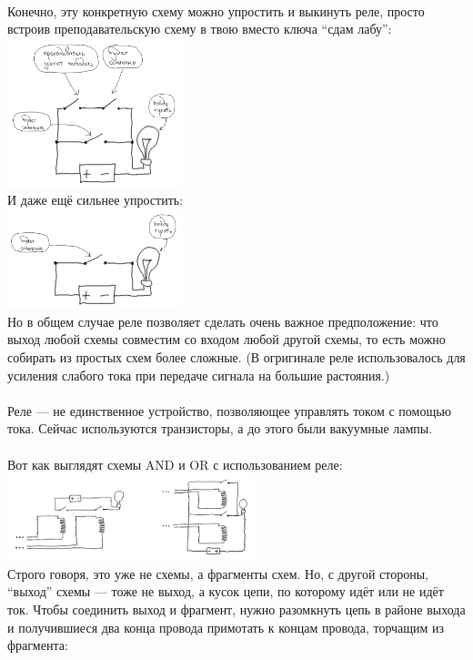 \documentclass[11pt]{book}
\begin{document}
\\
Конечно, эту конкретную схему можно упростить и выкинуть реле, просто встроив преподавательскую схему
в твою вместо ключа ``сдам лабу'':
\\
\includegraphics[width=2in]{pic/13.png}
\\
И даже ещё сильнее упростить:
\\
\includegraphics[width=2in]{pic/14.png}
\\
Но в общем случае реле позволяет сделать очень важное предположение:
что выход любой схемы совместим со входом любой другой схемы,
то есть можно собирать из простых схем более сложные.
(В огригинале реле использовалось для усиления слабого тока при передаче сигнала на большие растояния.)
\\ \\
Реле --- не единственное устройство, позволяющее управлять током с помощью тока.
Сейчас используются транзисторы, а до этого были вакуумные лампы.
\\ \\
Вот как выглядят схемы AND и OR с использованием реле:
\\
\includegraphics[height=1in]{pic/15.png}
\\
Строго говоря, это уже не схемы, а фрагменты схем. Но, с другой стороны, ``выход'' схемы ---
тоже не выход, а кусок цепи, по которому идёт или не идёт ток. Чтобы соединить выход
и фрагмент, нужно разомкнуть цепь в районе выхода и получившиеся два конца провода примотать
к концам провода, торчащим из фрагмента:
\end{document}
